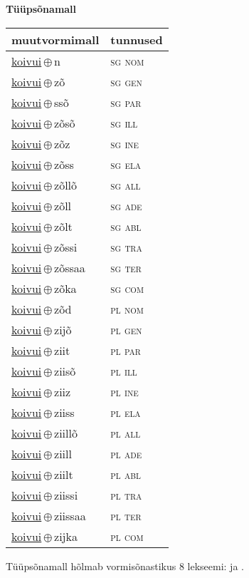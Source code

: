 

\vspace{3.5em}
\noindent \begin{minipage}{\textwidth}
\noindent \textbf{Tüüpsõnamall \,}\\

\begin{sideways}
\begin{tabular}{l l}
muutvormimall & tunnused \\
\hline
\underline{koivui}\,$\oplus$\,n & \textsc{ sg nom } \\
\underline{koivui}\,$\oplus$\,zõ & \textsc{ sg gen } \\
\underline{koivui}\,$\oplus$\,ssõ & \textsc{ sg par } \\
\underline{koivui}\,$\oplus$\,zõsõ & \textsc{ sg ill } \\
\underline{koivui}\,$\oplus$\,zõz & \textsc{ sg ine } \\
\underline{koivui}\,$\oplus$\,zõss & \textsc{ sg ela } \\
\underline{koivui}\,$\oplus$\,zõllõ & \textsc{ sg all } \\
\underline{koivui}\,$\oplus$\,zõll & \textsc{ sg ade } \\
\underline{koivui}\,$\oplus$\,zõlt & \textsc{ sg abl } \\
\underline{koivui}\,$\oplus$\,zõssi & \textsc{ sg tra } \\
\underline{koivui}\,$\oplus$\,zõssaa & \textsc{ sg ter } \\
\underline{koivui}\,$\oplus$\,zõka & \textsc{ sg com } \\
\underline{koivui}\,$\oplus$\,zõd & \textsc{ pl nom } \\
\underline{koivui}\,$\oplus$\,zijõ & \textsc{ pl gen } \\
\underline{koivui}\,$\oplus$\,ziit & \textsc{ pl par } \\
\underline{koivui}\,$\oplus$\,ziisõ & \textsc{ pl ill } \\
\underline{koivui}\,$\oplus$\,ziiz & \textsc{ pl ine } \\
\underline{koivui}\,$\oplus$\,ziiss & \textsc{ pl ela } \\
\underline{koivui}\,$\oplus$\,ziillõ & \textsc{ pl all } \\
\underline{koivui}\,$\oplus$\,ziill & \textsc{ pl ade } \\
\underline{koivui}\,$\oplus$\,ziilt & \textsc{ pl abl } \\
\underline{koivui}\,$\oplus$\,ziissi & \textsc{ pl tra } \\
\underline{koivui}\,$\oplus$\,ziissaa & \textsc{ pl ter } \\
\underline{koivui}\,$\oplus$\,zijka & \textsc{ pl com } \\
\end{tabular}
\end{sideways}
\label{tab:tüüpsõnamall-koivuin}

\end{minipage}

 
\vspace{1em}
\noindent Tüüpsõnamall  hõlmab vormisõnastikus 8 lekseemi:  ja .
